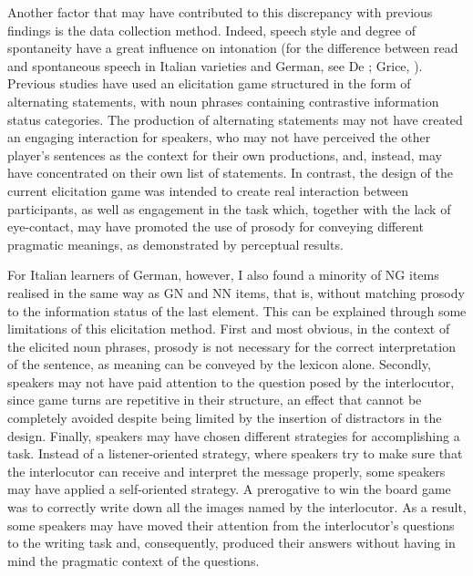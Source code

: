 Another factor that may have contributed to this discrepancy with previous findings is the data collection method. Indeed, speech style and degree of spontaneity have a great influence on intonation (for the difference between read and spontaneous speech in Italian varieties and German, see De \citealt{Ruiter2015}; Grice, \citealt{SavinoRefice1997}). Previous studies have used an elicitation game structured in the form of alternating statements, with noun phrases containing contrastive information status categories. The production of alternating statements may not have created an engaging interaction for speakers, who may not have perceived the other player’s sentences as the context for their own productions, and, instead, may have concentrated on their own list of statements. In contrast, the design of the current elicitation game was intended to create real interaction between participants, as well as engagement in the task which, together with the lack of eye-contact, may have promoted the use of prosody for conveying different pragmatic meanings, as demonstrated by perceptual results.

For Italian learners of German, however, I also found a minority of NG items realised in the same way as GN and NN items, that is, without matching prosody to the information status of the last element. This can be explained through some limitations of this elicitation method. First and most obvious, in the context of the elicited noun phrases, prosody is not necessary for the correct interpretation of the sentence, as meaning can be conveyed by the lexicon alone. Secondly, speakers may not have paid attention to the question posed by the interlocutor, since game turns are repetitive in their structure, an effect that cannot be completely avoided despite being limited by the insertion of distractors in the design. Finally, speakers may have chosen different strategies for accomplishing a task. Instead of a listener-oriented strategy, where speakers try to make sure that the interlocutor can receive and interpret the message properly, some speakers may have applied a self-oriented strategy. A prerogative to win the board game was to correctly write down all the images named by the interlocutor. As a result, some speakers may have moved their attention from the interlocutor’s questions to the writing task and, consequently, produced their answers without having in mind the pragmatic context of the questions.

